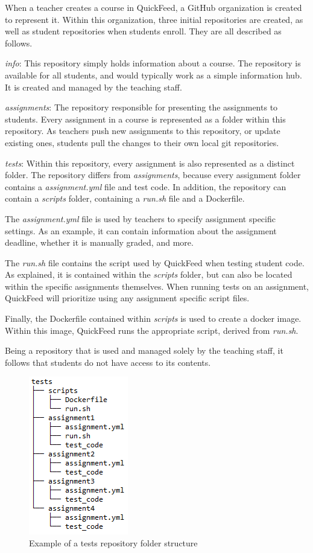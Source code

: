 When a teacher creates a course in QuickFeed, a GitHub organization is created to represent it.
Within this organization, three initial repositories are created, as well as student repositories when students enroll.
They are all described as follows.

\textit{info}: This repository simply holds information about a course.
The repository is available for all students, and would typically work as a simple information hub.
It is created and managed by the teaching staff.

\textit{assignments}: The repository responsible for presenting the assignments to students.
Every assignment in a course is represented as a folder within this repository.
As teachers push new assignments to this repository, or update existing ones, students pull the changes to their own local git repositories.

\textit{tests}: Within this repository, every assignment is also represented as a distinct folder.
The repository differs from \textit{assignments}, because every assignment folder contains a \textit{assignment.yml} file and test code.
In addition, the repository can contain a \textit{scripts} folder, containing a \textit{run.sh} file and a Dockerfile.

The \textit{assignment.yml} file is used by teachers to specify assignment specific settings.
As an example, it can contain information about the assignment deadline, whether it is manually graded, and more.

The \textit{run.sh} file contains the script used by QuickFeed when testing student code.
As explained, it is contained within the \textit{scripts} folder, but can also be located within the specific assignments themselves.
When running tests on an assignment, QuickFeed will prioritize using any assignment specific script files.

Finally, the Dockerfile contained within \textit{scripts} is used to create a docker image.
Within this image, QuickFeed runs the appropriate script, derived from \textit{run.sh}.

Being a repository that is used and managed solely by the teaching staff, it follows that students do not have access to its contents.

\begin{figure}[ht]
    \centering
    \includegraphics[scale=0.8]{photos/tests-repository-structure.PNG}
    \caption{Example of a tests repository folder structure}
    \label{fig:tests-repository-structure}
\end{figure}

